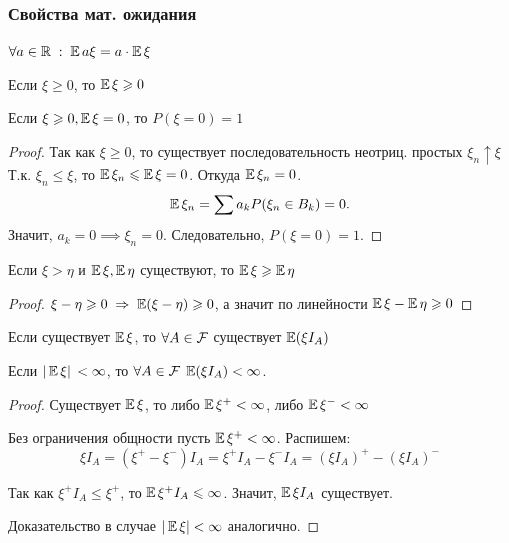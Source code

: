 \subsubsection*{Свойства мат. ожидания}
\begin{trait}
    \(\forall a \in \mathbb{R} \;:\; \operatorname{\mathbb{E}} a\xi = a\cdot\operatorname{\mathbb{E}}\xi\)
\end{trait}

\begin{trait}
\label{trait-mathexp-2}
    Если
    \(\xi \geqslant 0\), то \( \operatorname{\mathbb{E}}\xi \geqslant 0\)
    
    \hspace{14ex} Если \(\xi \geqslant 0, \operatorname{\mathbb{E}}\xi = 0 \), то \( P(\xi = 0) = 1\)
\end{trait}
\begin{proof}
        Так как $\xi \geqslant 0$, то существует последовательность неотриц. простых $\xi_n \uparrow \xi$\\
        Т.к. $\xi_n \leqslant \xi$, то $\operatorname{\mathbb{E}}\xi_n \leqslant \operatorname{\mathbb{E}}\xi = 0$. Откуда $\operatorname{\mathbb{E}}\xi_n = 0$.
        \[\operatorname{\mathbb{E}}\xi_n = \sum a_k P(\xi_n \in B_k) = 0.\]
        Значит, $a_k = 0 \implies \xi_n = 0$. Следовательно, $P(\xi = 0) = 1$.
\end{proof}

\begin{trait}
Если $\xi > \eta$ и $\operatorname{\mathbb{E}}\xi, \operatorname{\mathbb{E}}\eta$ существуют, то $\operatorname{\mathbb{E}}\xi \geqslant \operatorname{\mathbb{E}}\eta$
\end{trait}
\begin{proof}
    \(\xi - \eta \geqslant 0 \;\Rightarrow \; \operatorname{\mathbb{E}}(\xi - \eta) \geqslant 0\), а значит по линейности \( \operatorname{\mathbb{E}}\xi  - \operatorname{\mathbb{E}}\eta \geqslant 0\)
\end{proof}

\begin{trait}
Если существует $\operatorname{\mathbb{E}}\xi$, то $\forall A \in \mathcal{F}$ существует $\operatorname{\mathbb{E}}(\xi I_A)$

\hspace{14.8ex}Если $|\operatorname{\mathbb{E}}\xi|\, < \infty$, то $\forall A \in \mathcal{F} \; \operatorname{\mathbb{E}}(\xi I_A) < \infty$.
\end{trait}
\begin{proof}
    Существует $\operatorname{\mathbb{E}}\xi$, то либо $\operatorname{\mathbb{E}}\xi^+ < \infty$, либо $\operatorname{\mathbb{E}}\xi^- < \infty$
    
    Без ограничения общности пусть $\operatorname{\mathbb{E}}\xi^+ < \infty$. Распишем:
    \[\xi I_A = (\xi^+ - \xi^-) I_A = \xi^+ I_A - \xi^- I_A =  (\xi I_A)^+ - (\xi I_A)^-\]
    
    Так как $\xi^+ I_A \leqslant \xi^+$, то $\operatorname{\mathbb{E}}\xi^+ I_A \leqslant \infty$. Значит, $\operatorname{\mathbb{E}}\xi I_A$ существует.
    
    Доказательство в случае $|\operatorname{\mathbb{E}}\xi| < \infty$ аналогично.
\end{proof}

